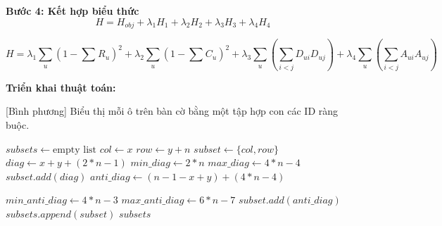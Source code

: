 \textbf{Bước 4: Kết hợp biểu thức}
\[
H =H_{obj}+\lambda_1 H_1+\lambda_2 H_2+\lambda_3 H_3+\lambda_4 H_4
\]

\[
	H =
	\lambda_1 \sum_{u}^{}{(1-\sum{}^{}{R_u})^2} + 
	\lambda_2 \sum_{u}^{}{(1-\sum{}^{}{C_u})^2} +
	\lambda_3 \sum_{u}^{}{( \sum_{i<j}^{}{D_{ui}D_{uj}})} +
	\lambda_4 \sum_{u}^{}{( \sum_{i<j}^{}{A_{ui}A_{uj}})}
\]

\textbf{Triển khai thuật toán:}


\begin{algorithm}[H]
    \caption{[Bình phương] Biểu thị mỗi ô trên bàn cờ bằng một tập hợp con các ID ràng buộc.}
    \begin{algorithmic}[1]
   	
	
        \State $subsets \gets \text{empty list}$
                \State $col \gets x$ 
                \State $row \gets y + n$ 
                \State $subset \gets \{col, row\}$
                \State $diag \gets x + y + (2*n - 1)$ 
                \State $min\_diag \gets 2*n$
                \State $max\_diag \gets 4*  n - 4$
                    \State $subset.add(diag)$
                \EndIf
                \State $anti\_diag \gets (n - 1 - x + y) + (4*n - 4)$ 
                
                \State $min\_anti\_diag \gets 4*n - 3$
                \State $max\_anti\_diag \gets 6*n - 7$
                    \State $subset.add(anti\_diag)$
                \EndIf
                \State $subsets.append(subset)$
            \EndFor
        \EndFor
        \State \Return $subsets$
    \EndFunction
    \end{algorithmic}
\end{algorithm}


